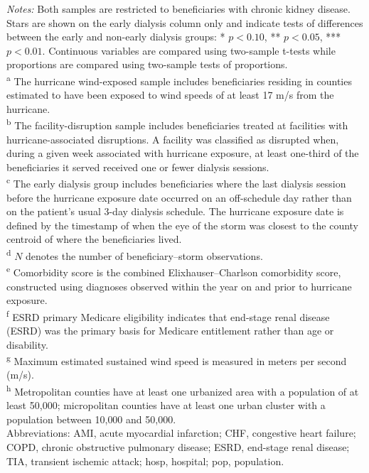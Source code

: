 \documentclass[11pt]{article}
\newcommand{\tn}[1]{\textsuperscript{#1}}
\begin{document}
\vspace{0.5em}
\footnotesize
\noindent
\textit{Notes:} Both samples are restricted to beneficiaries with chronic kidney disease. Stars are shown on the early dialysis column only and indicate tests of differences between the early and non-early dialysis groups: * \(p < 0.10\), ** \(p < 0.05\), *** \(p < 0.01\). Continuous variables are compared using two-sample t-tests while proportions are compared using two-sample tests of proportions.
\\[0.35em]
\tn{a} The hurricane wind-exposed sample includes beneficiaries residing in counties estimated to have been exposed to wind speeds of at least 17 m/s from the hurricane.
\\[0.35em]
\tn{b} The facility-disruption sample includes beneficiaries treated at facilities with hurricane-associated disruptions. A facility was classified as disrupted when, during a given week associated with hurricane exposure, at least one-third of the beneficiaries it served received one or fewer dialysis sessions.
\\[0.35em]
\tn{c} The early dialysis group includes beneficiaries where the last dialysis session before the hurricane exposure date occurred on an off-schedule day rather than on the patient's usual 3-day dialysis schedule. The hurricane exposure date is defined by the timestamp of when the eye of the storm was closest to the county centroid of where the beneficiaries lived.
\\[0.35em]
\tn{d} \(N\) denotes the number of beneficiary--storm observations.
\\[0.35em]
\tn{e} Comorbidity score is the combined Elixhauser--Charlson comorbidity score, constructed using diagnoses observed within the year on and prior to hurricane exposure.
\\[0.35em]
\tn{f} ESRD primary Medicare eligibility indicates that end-stage renal disease (ESRD) was the primary basis for Medicare entitlement rather than age or disability.
\\[0.35em]
\tn{g} Maximum estimated sustained wind speed is measured in meters per second (m/s).
\\[0.35em]
\tn{h} Metropolitan counties have at least one urbanized area with a population of at least 50{,}000; micropolitan counties have at least one urban cluster with a population between 10{,}000 and 50{,}000.
\\[0.35em]
Abbreviations: AMI, acute myocardial infarction; CHF, congestive heart failure; COPD, chronic obstructive pulmonary disease; ESRD, end-stage renal disease; TIA, transient ischemic attack; hosp, hospital; pop, population.
\end{document}
